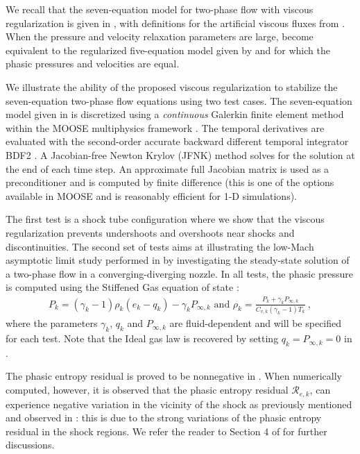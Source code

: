 We recall that the seven-equation model for two-phase flow with viscous regularization is given 
in , with definitions for the artificial viscous fluxes 
from . 
%
When the pressure and velocity relaxation parameters are large,  
become equivalent to the regularized five-equation model given by  and for which 
the phasic pressures and velocities are equal.

%
We illustrate the ability of the proposed viscous regularization to stabilize the 
seven-equation two-phase flow equations using two test cases. The seven-equation model given in  is discretized
using a \emph{continuous} Galerkin finite element method within the MOOSE multiphysics framework \cite{Moose}. The temporal derivatives are evaluated
with the second-order accurate backward different temporal integrator BDF2 \cite{bdf2}. A Jacobian-free Newton Krylov (JFNK) method solves for the solution
at the end of each time step. An approximate full Jacobian matrix is used as a preconditioner and is computed by finite difference 
(this is one of the options available in MOOSE and is reasonably efficient for 1-D simulations).

The first test is a shock tube configuration where we show that the viscous regularization prevents undershoots 
and overshoots near shocks and discontinuities. The second set of tests aims at illustrating the low-Mach asymptotic limit study performed in  by investigating the steady-state solution
of a two-phase flow in a converging-diverging nozzle. In all tests, the phasic pressure is computed using the Stiffened Gas equation of state \cite{SGEOS}:
%
\begin{align}\label{eq:sgeos}
P_k = (\gamma_k-1) \rho_k( e_k -q_k) -\gamma_k P_{\infty,k} \text{ and }
\rho_k = \frac{P_k+\gamma_k P_{\infty,k}}{C_{v,k} (\gamma_k-1)T_k} \ ,
\end{align}
%
where the parameters $\gamma_k$, $q_k$ and $P_{\infty,k}$ are fluid-dependent and will be specified for each test. Note that the Ideal gas law is recovered by setting 
$q_k = P_{\infty,k}=0$ in .
%
\begin{my_remark}
The phasic entropy residual is proved to be nonnegative in . When numerically computed, however, it is observed that the phasic entropy residual $\mathcal{R}_{e,k}$,
can experience negative variation in the vicinity of the shock as previously mentioned and observed in \cite{Guermond_Pasquetti}: this is due to the strong variations of the phasic entropy 
residual in the shock regions. We refer the reader to Section 4 of \cite{Guermond_Pasquetti} for further discussions.
\end{my_remark}
%

